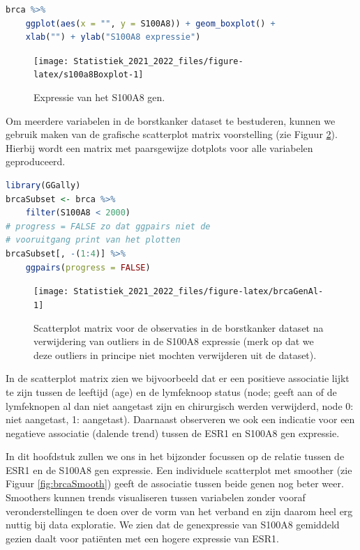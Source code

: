 \documentclass[
  12pt,dutch,coursenotes]{book}
\theoremstyle{definition}
\theoremstyle{definition}
\theoremstyle{definition}
\theoremstyle{definition}
\theoremstyle{remark}
\begin{document}
\begin{lstlisting}[language=R]
brca %>%
    ggplot(aes(x = "", y = S100A8)) + geom_boxplot() +
    xlab("") + ylab("S100A8 expressie")
\end{lstlisting}

\begin{figure}

{\centering \texttt{[image: Statistiek\_2021\_2022\_files/figure-latex/s100a8Boxplot-1]} 

}

\caption{Expressie van het S100A8 gen.}\label{fig:s100a8Boxplot}
\end{figure}

Om meerdere variabelen in de borstkanker dataset te bestuderen, kunnen we gebruik maken van de grafische scatterplot matrix voorstelling (zie Figuur \ref{fig:brcaGenAl}). Hierbij wordt een matrix met paarsgewijze dotplots voor alle variabelen geproduceerd.

\begin{lstlisting}[language=R]
library(GGally)
brcaSubset <- brca %>%
    filter(S100A8 < 2000)
# progress = FALSE zo dat ggpairs niet de
# vooruitgang print van het plotten
brcaSubset[, -(1:4)] %>%
    ggpairs(progress = FALSE)
\end{lstlisting}

\begin{figure}

{\centering \texttt{[image: Statistiek\_2021\_2022\_files/figure-latex/brcaGenAl-1]} 

}

\caption{Scatterplot matrix voor de observaties in de borstkanker dataset na verwijdering van outliers in de S100A8 expressie (merk op dat we deze outliers in principe niet mochten verwijderen uit de dataset).}\label{fig:brcaGenAl}
\end{figure}

In de scatterplot matrix zien we bijvoorbeeld dat er een positieve associatie lijkt te zijn tussen de leeftijd (age) en de lymfeknoop status (node; geeft aan of de lymfeknopen al dan niet aangetast zijn en chirurgisch werden verwijderd, node 0: niet aangetast, 1: aangetast). Daarnaast observeren we ook een indicatie voor een negatieve associatie (dalende trend) tussen de ESR1 en S100A8 gen expressie.

In dit hoofdstuk zullen we ons in het bijzonder focussen op de relatie tussen de ESR1 en de S100A8 gen expressie. Een individuele scatterplot met smoother (zie Figuur \ref{fig:brcaSmooth}) geeft de associatie tussen beide genen nog beter weer.
Smoothers kunnen trends visualiseren tussen variabelen zonder vooraf veronderstellingen te doen over de vorm van het verband en zijn daarom heel erg nuttig bij data exploratie.
We zien dat de genexpressie van S100A8 gemiddeld gezien daalt voor patiënten met een hogere expressie van ESR1.
\end{document}
